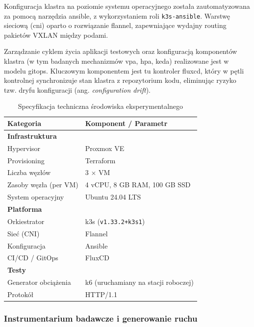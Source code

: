 Konfiguracja klastra na poziomie systemu operacyjnego została zautomatyzowana za pomocą narzędzia \gls{ansible}, 
z wykorzystaniem roli \texttt{k3s-ansible}. Warstwę sieciową (\gls{cni}) oparto o rozwiązanie \gls{flannel}, 
zapewniające wydajny routing pakietów VXLAN między podami.

Zarządzanie cyklem życia aplikacji testowych oraz konfiguracją komponentów klastra (w tym badanych mechanizmów 
\gls{vpa}, \gls{hpa}, \gls{keda}) realizowane jest w modelu \gls{gitops}. Kluczowym komponentem jest tu kontroler 
\gls{fluxcd}, który w pętli kontrolnej synchronizuje stan klastra z repozytorium kodu, eliminując ryzyko tzw. dryfu 
konfiguracji (ang. \textit{configuration drift}).

\begin{table}[ht]
    \centering
    \caption{Specyfikacja techniczna środowiska eksperymentalnego}
    \label{tab:srodowisko_testowe}
    \vspace{0.3cm}
    \begin{tabular}{@{}ll@{}}
        \toprule
        \textbf{Kategoria} & \textbf{Komponent / Parametr} \\
        \midrule
        \textbf{Infrastruktura} & \\
        Hypervisor & Proxmox VE \\
        Provisioning & Terraform \\
        Liczba węzłów & 3 $\times$ VM \\
        Zasoby węzła (per VM) & 4 vCPU, 8 GB RAM, 100 GB SSD \\
        System operacyjny & Ubuntu 24.04 LTS \\
        \midrule
        \textbf{Platforma} & \\
        Orkiestrator & k3s (\texttt{v1.33.2+k3s1}) \\
        Sieć (CNI) & Flannel \\
        Konfiguracja & Ansible \\
        CI/CD / GitOps & FluxCD \\
        \midrule
        \textbf{Testy} & \\
        Generator obciążenia & k6 (uruchamiany na stacji roboczej) \\
        Protokół & HTTP/1.1 \\
        \bottomrule
    \end{tabular}
\end{table}

\subsubsection{Instrumentarium badawcze i generowanie ruchu}

